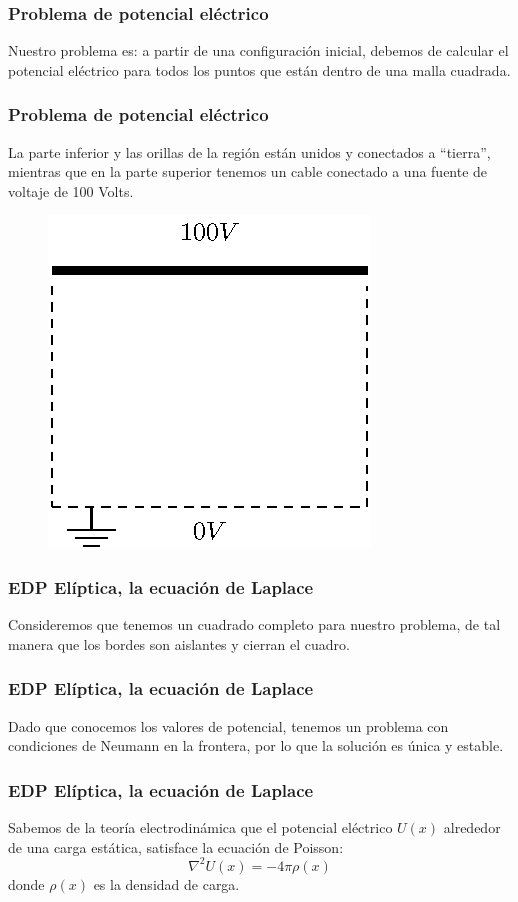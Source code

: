 \documentclass[12pt]{beamer}
\begin{document}
\begin{frame}
\frametitle{Problema de potencial eléctrico}
Nuestro problema es: a partir de una configuración inicial, debemos de calcular el potencial eléctrico para todos los puntos que están dentro de una malla cuadrada.
\end{frame}
\begin{frame}
\frametitle{Problema de potencial eléctrico}
La parte inferior y las orillas de la región están unidos y conectados a \enquote{tierra}, mientras que en la parte superior tenemos un cable conectado a una fuente de voltaje de 100 Volts.
\begin{figure}
	\centering
	\includegraphics[scale=0.6]{Imagenes/mallaSolucionEDP_02.eps}
\end{figure}
\end{frame}
\begin{frame}
\frametitle{EDP Elíptica, la ecuación de Laplace}
Consideremos que tenemos un cuadrado completo para nuestro problema, de tal manera que los bordes son aislantes y cierran el cuadro.
\end{frame}
\begin{frame}
\frametitle{EDP Elíptica, la ecuación de Laplace}
Dado que conocemos los valores de potencial, tenemos un problema con condiciones de Neumann en la frontera, por lo que la solución es única y estable.
\end{frame}
\begin{frame}
\frametitle{EDP Elíptica, la ecuación de Laplace}
Sabemos de la teoría electrodinámica que el potencial eléctrico $U(x)$ alrededor de una carga estática, satisface la ecuación de Poisson:
\[ \nabla^{2} U(x) = - 4 \pi \rho(x) \]
donde $\rho(x)$ es la densidad de carga.
\end{frame}
\end{document}
